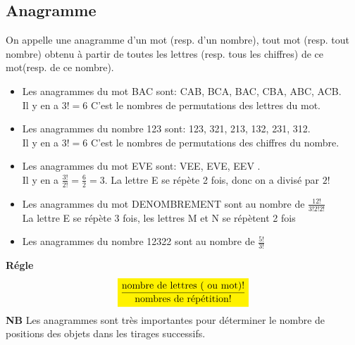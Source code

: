 \subsection*{Anagramme}
\begin{definition}
On appelle une  anagramme d'un mot (resp. d'un nombre), tout mot (resp. tout nombre) obtenu à partir de toutes les lettres (resp. tous les chiffres) de ce mot(resp. de ce nombre).
\end{definition}
\begin{example}
\begin{itemize}
\item Les anagrammes du mot BAC sont: CAB, BCA, BAC, CBA, ABC, ACB.\\
Il y en a $ 3!=6 $ C'est le nombres de permutations des lettres du mot.\\
\item Les anagrammes du nombre 123 sont: 123, 321, 213, 132, 231, 312.\\
Il y en a $ 3!=6 $ C'est le nombres de permutations des chiffres du nombre.\\
\item Les anagrammes du mot EVE sont: VEE, EVE, EEV .\\
Il y en a $ \frac{3!}{2!}=\frac{6}{2} =3$. La lettre E se répète  2 fois, donc on a divisé par $ 2! $ \\
\item Les anagrammes du mot DENOMBREMENT sont au nombre de $ \frac{12!}{3! 2!2!} $\\ La lettre E  se répète  3 fois, les lettres  M et N se répètent  2 fois \\
\item Les anagrammes du nombre 12322 sont au nombre de $ \frac{5!}{3!} $
\end{itemize}
\end{example}
\textbf{Régle}\\
\[ \colorbox{yellow}{$\dfrac{\textrm{nombre de lettres ( ou mot)!}}{\textrm{nombres de répétition!}}$}\]
\textbf{NB} Les anagrammes sont très importantes pour déterminer le nombre de positions des objets dans les tirages successifs.

